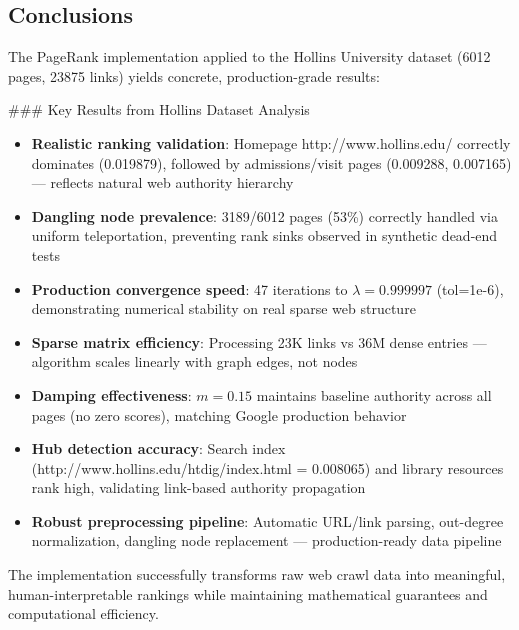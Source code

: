 \documentclass[11pt]{article}
\begin{document}
\subsection{Conclusions}

The PageRank implementation applied to the Hollins University dataset (6012 pages, 23875 links) yields concrete, production-grade results:

### Key Results from Hollins Dataset Analysis
\begin{itemize}
    \item \textbf{Realistic ranking validation}: Homepage http://www.hollins.edu/ correctly dominates (0.019879), followed by admissions/visit pages (0.009288, 0.007165) — reflects natural web authority hierarchy
    
    \item \textbf{Dangling node prevalence}: 3189/6012 pages (53\%) correctly handled via uniform teleportation, preventing rank sinks observed in synthetic dead-end tests
    
    \item \textbf{Production convergence speed}: 47 iterations to $\lambda = 0.999997$ (tol=1e-6), demonstrating numerical stability on real sparse web structure
    
    \item \textbf{Sparse matrix efficiency}: Processing 23K links vs 36M dense entries — algorithm scales linearly with graph edges, not nodes
    
    \item \textbf{Damping effectiveness}: $m=0.15$ maintains baseline authority across all pages (no zero scores), matching Google production behavior
    
    \item \textbf{Hub detection accuracy}: Search index (http://www.hollins.edu/htdig/index.html = 0.008065) and library resources rank high, validating link-based authority propagation
    
    \item \textbf{Robust preprocessing pipeline}: Automatic URL/link parsing, out-degree normalization, dangling node replacement — production-ready data pipeline
\end{itemize}

\noindent The implementation successfully transforms raw web crawl data into meaningful, human-interpretable rankings while maintaining mathematical guarantees and computational efficiency.
\end{document}
